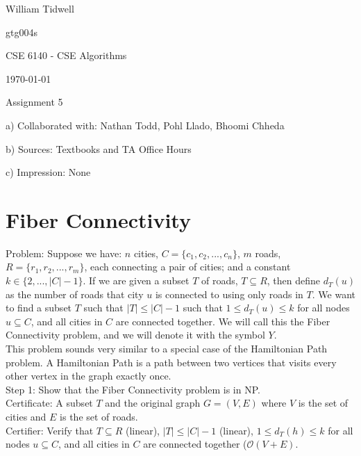 \documentclass{article}
\begin{document}
\begin{flushright}
William Tidwell \par
gtg004s \par
CSE 6140 - CSE Algorithms \par
\today \par
\end{flushright}

\begin{center}
Assignment 5
\end{center}

\begin{flushleft}
a) Collaborated with: Nathan Todd, Pohl Llado, Bhoomi Chheda \par
b) Sources: Textbooks and TA Office Hours \par
c) Impression: None \par
\end{flushleft}

\section{Fiber Connectivity}

Problem: Suppose we have: $n$ cities, $C = \{c_1, c_2, ..., c_n\}$, $m$ roads, $R = \{r_1, r_2,..., r_m\}$, each connecting a pair of cities; and a constant $k \in \{2,...,|C|-1\}$. If we are given a subset $T$ of roads, $T \subseteq R$, then define $d_T(u)$ as the number of roads that city $u$ is connected to using only roads in $T$. We want to find a subset $T$ such that $|T| \leq |C|-1$ such that $1 \leq d_T(u) \leq k$ for all nodes $u \subseteq C$, and all cities in $C$ are connected together. We will call this the Fiber Connectivity problem, and we will denote it with the symbol $Y$.\\

This problem sounds very similar to a special case of the Hamiltonian Path problem. A Hamiltonian Path is a path between two vertices that visits every other vertex in the graph exactly once. \\

Step 1: Show that the Fiber Connectivity problem is in NP. \\
Certificate: A subset $T$ and the original graph $G=(V,E)$ where $V$ is the set of cities and $E$ is the set of roads. \\
Certifier: Verify that $T \subseteq R$ (linear), $|T| \leq |C|-1$ (linear), $1 \leq d_T(h) \leq k$ for all nodes $u \subseteq C$, and all cities in $C$ are connected together ($\mathcal{O}(V+E)$.\\
\end{document}
